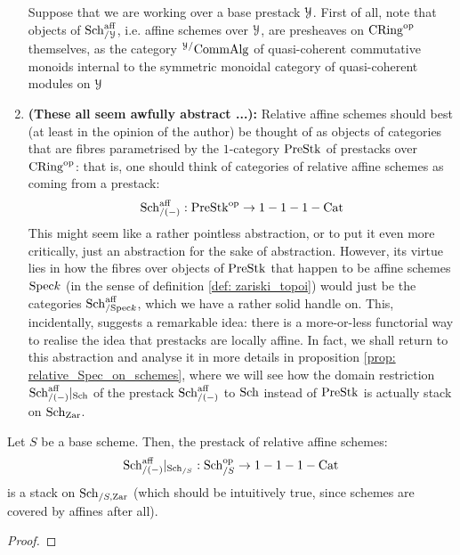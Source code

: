 \begin{remark}
\begin{enumerate}
                            Suppose that we are working over a base prestack $\mathcal{Y}$. First of all, note that objects of $\mathrm{Sch}^{\mathrm{aff}}_{/\mathcal{Y}}$, i.e. affine schemes over $\mathcal{Y}$, are presheaves on $\mathrm{CRing}^{\mathrm{op}}$ themselves, as the category ${}^{\mathcal{Y}/}\mathrm{Comm}\mathrm{Alg}$ of quasi-coherent commutative monoids internal to the symmetric monoidal category of quasi-coherent modules on $\mathcal{Y}$
                            \item \textbf{(These all seem awfully abstract ...):} Relative affine schemes should best (at least in the opinion of the author) be thought of as objects of categories that are fibres parametrised by the $1$-category $\mathrm{Pre}\mathrm{Stk}$ of prestacks over $\mathrm{CRing}^{\mathrm{op}}$: that is, one should think of categories of relative affine schemes as coming from a prestack:
                                $$\mathrm{Sch}^{\mathrm{aff}}_{/(-)}: \mathrm{Pre}\mathrm{Stk}^{\mathrm{op}} \to 1-1-1-\mathrm{Cat}$$
                            This might seem like a rather pointless abstraction, or to put it even more critically, just an abstraction for the sake of abstraction. However, its virtue lies in how the fibres over objects of $\mathrm{Pre}\mathrm{Stk}$ that happen to be affine schemes $\mathrm{Spec} k$ (in the sense of definition \ref{def: zariski_topoi}) would just be the categories $\mathrm{Sch}^{\mathrm{aff}}_{/\mathrm{Spec} k}$, which we have a rather solid handle on. This, incidentally, suggests a remarkable idea: there is a more-or-less functorial way to realise the idea that prestacks are locally affine. In fact, we shall return to this abstraction and analyse it in more details in proposition \ref{prop: relative_Spec_on_schemes}, where we will see how the domain restriction $\mathrm{Sch}^{\mathrm{aff}}_{/(-)}|_{\mathrm{Sch}}$ of the prestack $\mathrm{Sch}^{\mathrm{aff}}_{/(-)}$ to $\mathrm{Sch}$ instead of $\mathrm{Pre}\mathrm{Stk}$ is actually stack on $\mathrm{Sch}_{\mathrm{Zar}}$.
                        \end{enumerate}
                    \end{remark}
                    
                    \begin{proposition} \label{prop: relative_Spec_on_schemes}
                        Let $S$ be a base scheme. Then, the prestack of relative affine schemes:
                            $$\mathrm{Sch}^{\mathrm{aff}}_{/(-)}|_{\mathrm{Sch}_{/S}}: \mathrm{Sch}_{/S}^{\mathrm{op}} \to 1-1-1-\mathrm{Cat}$$
                        is a stack on $\mathrm{Sch}_{/S, \mathrm{Zar}}$ (which should be intuitively true, since schemes are covered by affines after all).
                    \end{proposition}
                        \begin{proof}
                            
                        \end{proof}
                
